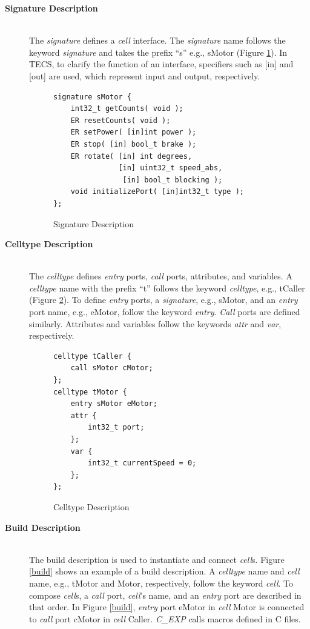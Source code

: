\documentclass[S,R,E]{article/compsoft}
\begin{document}
\begin{description}
    \item[{\bf Signature Description}]\mbox{}\\
        The {\it signature} defines a {\it cell} interface.
        The {\it signature} name follows the keyword {\it signature} and takes the prefix ``s'' e.g., sMotor (Figure \ref{signature}).
        In TECS, to clarify the function of an interface, specifiers such as [in] and [out] are used, which represent input and output, respectively.
\begin{figure}[t]
\centering
\begin{lstlisting}
signature sMotor {
    int32_t getCounts( void );
    ER resetCounts( void );
    ER setPower( [in]int power );
    ER stop( [in] bool_t brake );
    ER rotate( [in] int degrees,
               [in] uint32_t speed_abs,
                [in] bool_t blocking );
    void initializePort( [in]int32_t type );
};
\end{lstlisting}
\caption{Signature Description}
\label{signature}
\end{figure}
    \item[{\bf Celltype Description}]\mbox{}\\
        The {\it celltype} defines {\it entry} ports, {\it call} ports, attributes, and variables.
        A {\it celltype} name with the prefix ``t'' follows the keyword {\it celltype}, e.g., tCaller (Figure \ref{celltype}).
        To define {\it entry} ports, a {\it signature}, e.g., sMotor, and an {\it entry} port name, e.g., eMotor, follow the keyword {\it entry}.
        {\it Call} ports are defined similarly.
        Attributes and variables follow the keywords {\it attr} and {\it var}, respectively.
\begin{figure}[t]
\centering
\begin{lstlisting}
celltype tCaller {
    call sMotor cMotor;
};
celltype tMotor {
    entry sMotor eMotor;
    attr {
        int32_t port;
    };
    var {
        int32_t currentSpeed = 0;
    };
};
\end{lstlisting}
\caption{Celltype Description}
\label{celltype}
\end{figure}
    \item[{\bf Build Description}]\mbox{}\\
        The build description is used to instantiate and connect {\it cell}s.
        Figure \ref{build} shows an example of a build description.
        A {\it celltype} name and {\it cell} name, e.g., tMotor and Motor, respectively, follow the keyword {\it cell}.
        To compose {\it cell}s, a {\it call} port, {\it cell}'s name, and an {\it entry} port are described in that order.
        In Figure \ref{build}, {\it entry} port eMotor in {\it cell} Motor is connected to {\it call} port cMotor in {\it cell} Caller.
        {\it C\_EXP} calls macros defined in C files.


\end{description}
\end{document}
